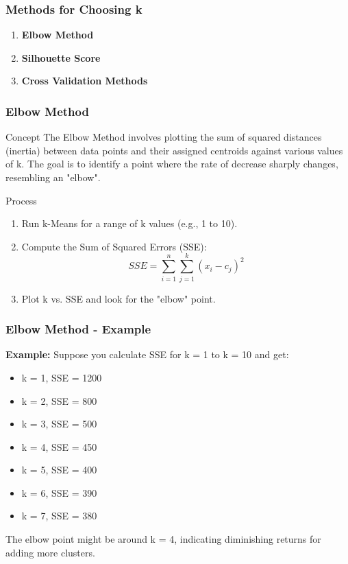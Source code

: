 \documentclass[aspectratio=169]{beamer}
\begin{document}
\begin{frame}[fragile]
  \frametitle{Methods for Choosing k}
  \begin{enumerate}
    \item \textbf{Elbow Method}
    \item \textbf{Silhouette Score}
    \item \textbf{Cross Validation Methods}
  \end{enumerate}
\end{frame}

\begin{frame}[fragile]
  \frametitle{Elbow Method}
  \begin{block}{Concept}
    The Elbow Method involves plotting the sum of squared distances (inertia) between data points and their assigned centroids against various values of k. The goal is to identify a point where the rate of decrease sharply changes, resembling an "elbow".
  \end{block}
  \begin{block}{Process}
    \begin{enumerate}
      \item Run k-Means for a range of k values (e.g., 1 to 10).
      \item Compute the Sum of Squared Errors (SSE):
      \begin{equation}
        SSE = \sum_{i=1}^{n} \sum_{j=1}^{k} (x_i - c_j)^2
      \end{equation}
      \item Plot k vs. SSE and look for the "elbow" point.
    \end{enumerate}
  \end{block}
\end{frame}

\begin{frame}[fragile]
  \frametitle{Elbow Method - Example}
  \textbf{Example:} Suppose you calculate SSE for k = 1 to k = 10 and get:
  \begin{itemize}
    \item k = 1, SSE = 1200
    \item k = 2, SSE = 800
    \item k = 3, SSE = 500
    \item k = 4, SSE = 450
    \item k = 5, SSE = 400
    \item k = 6, SSE = 390
    \item k = 7, SSE = 380
  \end{itemize}
  
  The elbow point might be around k = 4, indicating diminishing returns for adding more clusters.
\end{frame}
\end{document}

